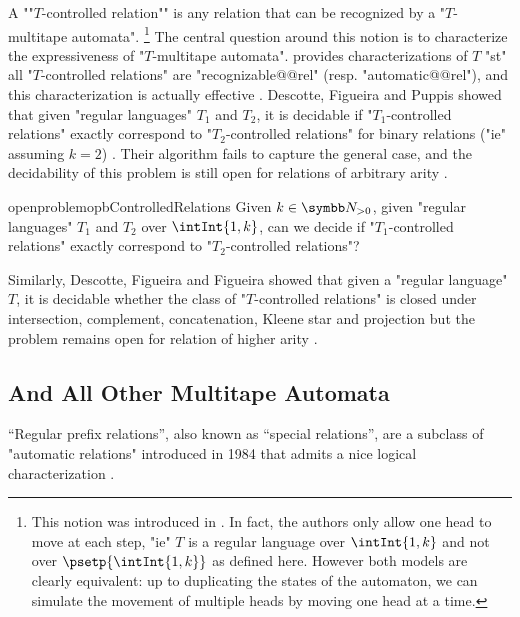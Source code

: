 A \AP""$T$-controlled relation"" is any relation that can be recognized by
a "$T$-multitape automata".%
\footnote{This notion was introduced in \cite[\S~3]{FigueiraLibkin2015SynchronizingRelations}.
In fact, the authors only allow one head to move at each step, "ie" $T$ is a regular language
over $\intInt{1,k}$ and not over $\psetp{\intInt{1,k}}$ as defined here. However both
models are clearly equivalent: up to duplicating the states of the automaton, we can simulate
the movement of multiple heads by moving one head at a time.}
The central question around this notion is to characterize the
expressiveness of "$T$-multitape automata".
\cite[Theorem~1]{FigueiraLibkin2015SynchronizingRelations} provides characterizations 
of $T$ "st" all "$T$-controlled relations" are "recognizable@@rel" (resp. "automatic@@rel"),
and this characterization is actually effective
\cite[Corollary~3]{FigueiraLibkin2015SynchronizingRelations}.
Descotte, Figueira and Puppis showed
that given "regular languages" $T_1$ and $T_2$, it is decidable
if "$T_1$-controlled relations" exactly correspond to "$T_2$-controlled relations"
for binary relations ("ie" assuming $k=2$)
\cite[Main Theorem]{DescotteFigueiraPuppis2018ResynchronizingClasses}.
Their algorithm fails to capture the general case, and the decidability of this problem
is still open for relations of arbitrary arity
\cite[\S~9]{DescotteFigueiraPuppis2018ResynchronizingClasses}.
\begin{restatable}{openproblem}{opbControlledRelations}
	\label{opb:controlled-relations}
	Given $k\in\Np$, given "regular languages" $T_1$ and $T_2$ over $\intInt{1,k}$,
	can we decide if "$T_1$-controlled relations" exactly correspond to
	"$T_2$-controlled relations"?
\end{restatable}
Similarly, Descotte, Figueira and Figueira showed that given a "regular language"
$T$, it is decidable whether the class of "$T$-controlled relations"
is closed under intersection, complement, concatenation, Kleene star 
and projection
\cite[Theorem, p.~2]{DescotteFigueiraFigueira2019ClosurePropertiesSynchronizedRelations}
but the problem remains open for relation of higher arity
\cite[\S~6]{DescotteFigueiraFigueira2019ClosurePropertiesSynchronizedRelations}.


\subsection{And All Other Multitape Automata}

``Regular prefix relations'', also known as ``special relations'', are a subclass of "automatic relations" introduced in 1984 that admits a nice logical characterization
\cite[\S~``1984'']{Choffrut2006Survey}.


